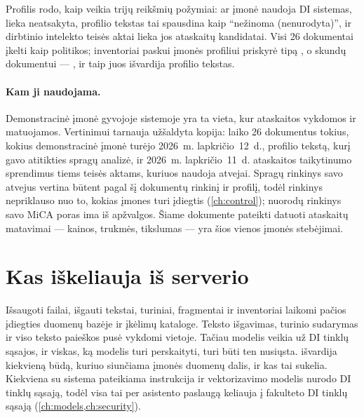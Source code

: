 Profilis rodo, kaip veikia trijų reikšmių požymiai: ar įmonė naudoja DI sistemas, lieka
neatsakyta, profilio tekstas tai spausdina kaip \enquote{nežinoma (nenurodyta)}, ir dirbtinio
intelekto teisės aktai lieka jos ataskaitų kandidatai. Visi 26 dokumentai įkelti kaip
politikos; inventoriai paskui įmonės profiliui priskyrė tipą , o skundų
dokumentui --- , ir taip juos išvardija profilio tekstas.

\paragraph{Kam ji naudojama.} Demonstracinė įmonė gyvojoje sistemoje yra ta vieta, kur
ataskaitos vykdomos ir matuojamos. Vertinimui tarnauja užšaldyta kopija:
 laiko 26 dokumentus tokius, kokius demonstracinė įmonė
turėjo 2026~m. lapkričio~12~d., profilio tekstą, kurį gavo atitikties spragų analizė, ir
2026~m. lapkričio~11~d. ataskaitos taikytinumo sprendimus tiems teisės aktams, kuriuos naudoja
atvejai. Spragų rinkinys savo atvejus vertina būtent pagal šį dokumentų rinkinį ir profilį,
todėl rinkinys nepriklauso nuo to, kokias įmones turi įdiegtis (\cref{ch:control}); nuorodų
rinkinys savo MiCA poras ima iš apžvalgos. Šiame dokumente pateikti datuoti ataskaitų matavimai
--- kainos, trukmės, tikslumas --- yra šios vienos įmonės stebėjimai.


\section{Kas iškeliauja iš serverio}\label{sec:company:leaves}

Išsaugoti failai, išgauti tekstai, turiniai, fragmentai ir inventoriai laikomi pačios įdiegties
duomenų bazėje ir įkėlimų kataloge. Teksto išgavimas, turinio sudarymas ir viso teksto paieškos pusė
vykdomi vietoje. Tačiau modelis veikia už DI tinklų sąsajos, ir viskas, ką modelis turi
perskaityti, turi būti ten nusiųsta.  išvardija kiekvieną būdą, kuriuo
siunčiama įmonės duomenų dalis, ir kas tai sukelia. Kiekviena su sistema pateikiama instrukcija ir
vektorizavimo modelis nurodo DI tinklų sąsają, todėl visa tai per asistento paslaugą keliauja į
fakulteto DI tinklų sąsają (\cref{ch:models,ch:security}).

